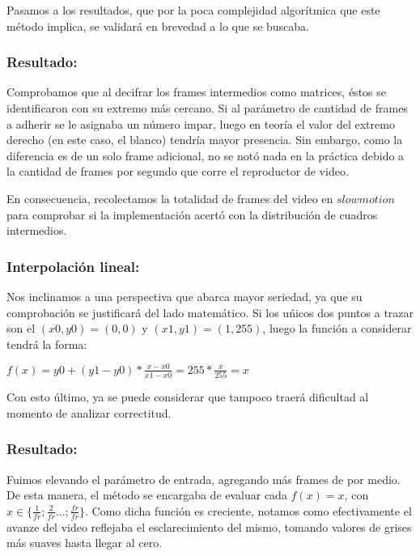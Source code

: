 Pasamos a los resultados, que por la poca complejidad algor\'itmica que este m\'etodo implica, se validar\'a en brevedad a lo que se buscaba. 

\subsubsection*{\bf{Resultado:}}

Comprobamos que al decifrar los frames intermedios como matrices, \'estos se identificaron con su extremo m\'as cercano. Si al par\'ametro de cantidad de frames a adherir se le asignaba un n\'umero impar, luego en teor\'ia el valor del extremo derecho (en este caso, el blanco) tendr\'ia mayor presencia. Sin embargo, como la diferencia es de un solo frame adicional, no se not\'o nada en la pr\'actica debido a la cantidad de frames por segundo que corre el reproductor de video. 

En consecuencia, recolectamos la totalidad de frames del video en $slowmotion$ para comprobar si la implementaci\'on acert\'o con la distribuci\'on de cuadros intermedios.

\subsubsection*{Interpolaci\'on lineal:}

Nos inclinamos a una perspectiva que abarca mayor seriedad, ya que su comprobaci\'on se justificar\'a del lado matem\'atico. Si los u\'nicos dos puntos a trazar son el $(x0,y0) = (0,0)$ y $(x1,y1) = (1,255)$, luego la funci\'on a considerar tendr\'a la forma:

$f(x) = y0 + (y1-y0) * \frac{x - x0}{x1 - x0} = 255 * \frac{x}{255} = x$

Con esto \'ultimo, ya se puede considerar que tampoco traer\'a dificultad al momento de analizar correctitud.

\subsubsection*{\bf{Resultado:}}

Fuimos elevando el par\'ametro de entrada, agregando m\'as frames de por medio. De esta manera, el m\'etodo se encargaba de evaluar cada $f(x) = x$, con $x \in \{ \frac{1}{fr} ; \frac{2}{fr} \ldots ; \frac{fr}{fr} \}$. Como dicha funci\'on es creciente, notamos como efectivamente el avanze del video reflejaba el esclarecimiento del mismo, tomando valores de grises m\'as suaves hasta llegar al cero.

